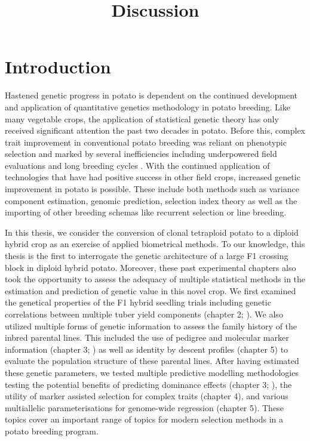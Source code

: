\documentclass[
]{article}
\title{Discussion}
\author{}
\date{}
\begin{document}
\maketitle


\section{Introduction}\label{introduction}

Hastened genetic progress in potato is dependent on the continued
development and application of quantitative genetics methodology in
potato breeding. Like many vegetable crops, the application of
statistical genetic theory has only received significant attention the
past two decades in potato. Before this, complex trait improvement in
conventional potato breeding was reliant on phenotypic selection and
marked by several inefficiencies including underpowered field
evaluations and long breeding cycles \autocite{Bradshaw2017}. With the
continued application of technologies that have had positive success in
other field crops, increased genetic improvement in potato is possible.
These include both methods such as variance component estimation,
genomic prediction, selection index theory as well as the importing of
other breeding schemas like recurrent selection or line breeding.

In this thesis, we consider the conversion of clonal tetraploid potato
to a diploid hybrid crop as an exercise of applied biometrical methods.
To our knowledge, this thesis is the first to interrogate the genetic
architecture of a large F1 crossing block in diploid hybrid potato.
Moreover, these past experimental chapters also took the opportunity to
assess the adequacy of multiple statistical methods in the estimation
and prediction of genetic value in this novel crop. We first examined
the genetical properties of the F1 hybrid seedling trials including
genetic correlations between multiple tuber yield components (chapter 2;
\textcite{Adams2022}). We also utilized multiple forms of genetic
information to assess the family history of the inbred parental lines.
This included the use of pedigree and molecular marker information
(chapter 3; \textcite{Adams2023}) as well as identity by descent
profiles (chapter 5) to evaluate the population structure of these
parental lines. After having estimated these genetic parameters, we
tested multiple predictive modelling methodologies testing the potential
benefits of predicting dominance effects (chapter 3;
\textcite{Adams2023}), the utility of marker assisted selection for
complex traits (chapter 4), and various multiallelic parameterisations
for genome-wide regression (chapter 5). These topics cover an important
range of topics for modern selection methods in a potato breeding
program.
\end{document}

